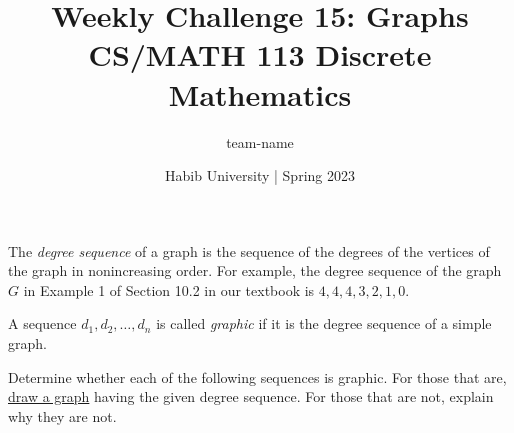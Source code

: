 \documentclass[a4paper,addpoints]{exam}
\title{Weekly Challenge 15: Graphs\\CS/MATH 113 Discrete Mathematics}
\author{team-name}  %
\date{Habib University | Spring 2023}
\begin{document}
\maketitle
\thispagestyle{empty}

\begin{questions}


  The \textit{degree sequence} of a graph is the sequence of the degrees of the vertices of the graph in nonincreasing order. For example, the degree sequence of the graph $G$ in Example 1 of Section 10.2 in our textbook is $4,4,4,3,2,1,0$.

  A sequence $d_1 , d_2 , \ldots , d_n$ is called \textit{graphic} if it is the degree sequence of a simple graph.

  Determine whether each of the following sequences is graphic. For those that are, \href{https://www.baeldung.com/cs/latex-drawing-graphs}{draw a graph} having the given degree sequence. For those that are not, explain why they are not.

\end{questions}
\end{document}
